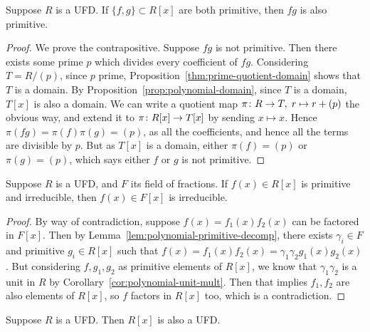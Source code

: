 \begin{lemma}\label{lem:gauss-primitive}
    Suppose \(R\) is a UFD.\@
    If \(\{f,g\} \subset R[x]\) are both primitive,
    then \(fg\) is also primitive.
\end{lemma}
\begin{proof}
    We prove the contrapositive.
    Suppose \(fg\) is not primitive.
    Then there exists some prime \(p\) which divides every coefficient of \(fg\).
    Considering \(T = R/(p)\), since \(p\) prime,
    Proposition~\ref{thm:prime-quotient-domain} shows that \(T\) is a domain.
    By Proposition~\ref{prop:polynomial-domain},
    since \(T\) is a domain, \(T[x]\) is also a domain.
    We can write a quotient map \(\pi\colon R\to T,\;r\mapsto r+(p)\) the obvious way,
    and extend it to \(\pi\colon R[x]\to T[x]\) by sending \(x \mapsto x\).
    Hence \(\pi(fg) = \pi(f)\pi(g) = (p)\),
    as all the coefficients, and hence all the terms are divisible by \(p\).
    But as \(T[x]\) is a domain, either \(\pi(f) = (p)\) or \(\pi(g) = (p)\),
    which says either \(f\) or \(g\) is not primitive.
\end{proof}
\begin{lemma}\label{lem:gauss-irreducible}
    Suppose \(R\) is a UFD, and \(F\) its field of fractions.
    If \(f(x) \in R[x]\) is primitive and irreducible,
    then \(f(x) \in F[x]\) is irreducible.
\end{lemma}
\begin{proof}
    By way of contradiction, suppose \(f(x) = f_1(x)f_2(x)\)
    can be factored in \(F[x]\).
    Then by Lemma~\ref{lem:polynomial-primitive-decomp},
    there exists \(\gamma_i \in F\) and primitive \(g_i \in R[x]\)
    such that \(f(x) = f_1(x)f_2(x) = \gamma_1\gamma_2 g_1(x)g_2(x)\).
    But considering \(f,g_1,g_2\) as primitive elements of \(R[x]\),
    we know that \(\gamma_1\gamma_2\) is a unit in \(R\)
    by Corollary~\ref{cor:polynomial-unit-mult}.
    Then that implies \(f_1,f_2\) are also elements of \(R[x]\),
    so \(f\) factors in \(R[x]\) too,
    which is a contradiction.
\end{proof}
\begin{theorem}
    Suppose \(R\) is a UFD.\@
    Then \(R[x]\) is also a UFD.\@
\end{theorem}
